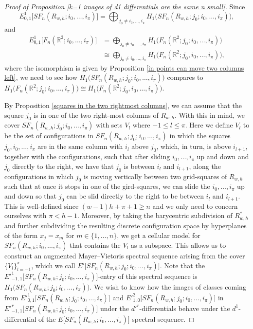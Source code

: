 \documentclass[pagebackref,colorlinks,citecolor=blue,linkcolor=blue,urlcolor=blue,filecolor=blue]{article}
\theoremstyle{definition}\newtheorem{definition}[thm]{Definition}
\theoremstyle{definition}
\newcommand{\R}{\ensuremath{\mathbb{R}}}
\begin{document}
\begin{proof}[Proof of Proposition \ref{k=1 images of d1 differentials are the same n small}]
Since
\[
E^{1}_{0,1}\big[SF_{n}(R_{w, h}; i_{0}, \dots, i_{\pi})\big]=\bigoplus_{j_{0}\neq i_{0}, \dots, i_{\pi}}H_{1}\big(SF_{n}(R_{w, h}; j_{0}; i_{0}, \dots, i_{\pi})\big),
\]
and 
\begin{align*}
E^{1}_{0,1}\big[F_{n}(\R^{2}; i_{0}, \dots, i_{\pi})\big]&=\bigoplus_{j_{0}\neq i_{0}, \dots, i_{\pi}}H_{1}\big(F_{n}(\R^{2}; j_{0}; i_{0}, \dots, i_{\pi})\big)\\
&\cong\bigoplus_{j_{0}\neq i_{0}, \dots, i_{\pi}}H_{1}\big(F_{n}(\R^{2}; j_{0}, i_{0}, \dots, i_{\pi})\big),
\end{align*}
where the isomorphism is given by Proposition \ref{in points can move two columns left}, we need to see how $H_{1}\big(SF_{n}(R_{w, h}; j_{0}; i_{0}, \dots, i_{\pi})\big)$ compares to $H_{1}\big(F_{n}(\R^{2}; j_{0}; i_{0}, \dots, i_{\pi})\big)\cong H_{1}\big(F_{n}(\R^{2}; j_{0}, i_{0}, \dots, i_{\pi})\big)$.

By Proposition \ref{squares in the two rightmost columns}, we can assume that the square $j_{0}$ is in one of the two right-most columns of $R_{w, h}$.
With this in mind, we cover $SF_{n}(R_{w, h}; j_{0}; i_{0}, \dots, i_{\pi})$ with sets $V_{l}$ where $-1\le l\le \pi$.
Here we define $V_{l}$ to be the set of configurations in $SF_{n}(R_{w, h}; j_{0}; i_{0}, \dots, i_{\pi})$ in which the squares $j_{0}, i_{0}, \dots, i_{\pi}$ are in the same column with $i_{l}$ above $j_{0}$, which, in turn, is above $i_{l+1}$, together with the configurations, such that after sliding $i_{0}, \dots, i_{\pi}$ up and down and $j_{0}$ directly to the right, we have that $j_{0}$ is between $i_{l}$ and $i_{l+1}$, along the configurations in which $j_{0}$ is moving vertically between two grid-squares of $R_{w,h}$ such that at once it stops in one of the gird-squares, we can slide the $i_{0}, \dots, i_{\pi}$ up and down so that $j_{0}$ can be slid directly to the right to be between $i_{l}$ and $i_{l+1}$.
This is well-defined since $(w-1)h+\pi+1\ge n$ and we only need to concern ourselves with $\pi<h-1$.
Moreover, by taking the barycentric subdivision of $R^{*}_{w,h}$ and further subdividing the resulting discrete configuration space by hyperplanes of the form $x_{j}=x_{m}$ for $m\in \{1,\dots, n\}$, we get a cellular model for $SF_{n}(R_{w, h}; i_{0}, \dots, i_{\pi})$ that contains the $V_{l}$ as a subspace.
This allows us to construct an augmented Mayer--Vietoris spectral sequence arising from the cover $\{V_{l}\}^{\pi}_{l=-1}$, which we call $E'\big[SF_{n}(R_{w, h}; j_{0}; i_{0}, \dots, i_{\pi})\big]$.
Note that the $E'^{1}_{-1, 1}\big[SF_{n}(R_{w, h}; j_{0}; i_{0}, \dots, i_{\pi})\big]$-entry of this spectral sequence is $H_{1}\big(SF_{n}(R_{w, h}; j_{0}; i_{0}, \dots, i_{\pi})\big)$.
We wish to know how the images of classes coming from $E'^{1}_{0, 1}\big[SF_{n}(R_{w, h}; j_{0}; i_{0}, \dots, i_{\pi})\big]$ and $E'^{2}_{1, 0}\big[SF_{n}(R_{w, h}; j_{0}; i_{0}, \dots, i_{\pi})\big]$ in $E'^{r}_{-1, 1}\big[SF_{n}(R_{w, h}; j_{0}; i_{0}, \dots, i_{\pi})\big]$ under the $d'^{r}$-differentials behave under the $d^{1}$-differential of the $E\big[SF_{n}(R_{w, h}; i_{0}, \dots, i_{\pi})\big]$ spectral sequence.


\end{proof}
\end{document}
